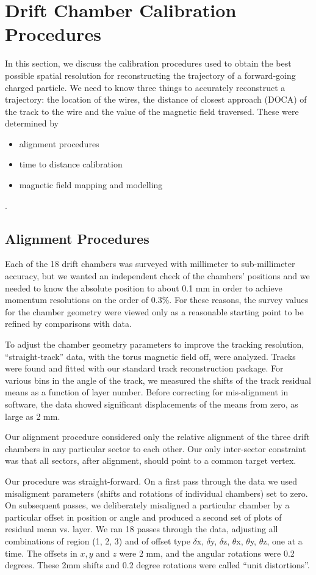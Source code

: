 \section{Drift Chamber Calibration Procedures}
In this section, we discuss the calibration procedures used to obtain the 
best possible spatial resolution for reconstructing the trajectory of
a forward-going charged particle.  We need to know three things to 
accurately reconstruct a trajectory: the location of the wires, the
distance of closest approach (DOCA) of the track to the wire and the
value of the magnetic field traversed.  These were determined by
\begin{itemize}
\item alignment procedures
\item time to distance calibration
\item magnetic field mapping and modelling
\end{itemize}.  


\subsection{Alignment Procedures}
\label{align}

\hskip 0.15in
Each of the 18 drift chambers was 
surveyed with millimeter to sub-millimeter
accuracy, but we wanted an independent check of the chambers' positions and 
we needed to know the absolute position to about 0.1 mm in order to 
achieve momentum resolutions on the order of 0.3\%.  For 
these reasons, the survey values for the chamber geometry were viewed only as 
a reasonable starting point to be refined by comparisons with data.

To adjust the chamber geometry parameters to improve the tracking resolution,
``straight-track'' data, with the torus magnetic field off, were analyzed.  
Tracks were found and fitted with our standard track reconstruction package.
For various bins in the angle of the track, we measured the shifts of the
track residual means as a function of layer number. 
Before correcting for mis-alignment in software, the data showed significant 
displacements of the means from zero, as large as 2 mm.  

Our alignment procedure considered only the relative alignment of the
three drift chambers in any particular sector to each other.
Our only inter-sector constraint was that all sectors, after alignment,
should point to a common target vertex.

Our procedure was straight-forward.  On a first pass through
the data we used misaligment parameters (shifts and rotations of individual
chambers) set to zero.  On subsequent passes, we deliberately misaligned
a particular chamber by a particular offset in position or angle and 
produced a second set of plots of residual mean vs. layer.  We ran 18 passes
through the data, adjusting all combinations of region (1, 2, 3) and
of offset type $\delta$x, $\delta$y, $\delta$z, $\theta$x, 
$\theta$y, $\theta$z, one at
a time.  The offsets in $x, y$ and $z$ were 2 mm, and the angular rotations
were 0.2 degrees.  These 2mm shifts and 0.2 degree rotations were
called ``unit distortions''.

